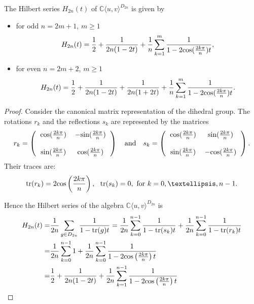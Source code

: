 \documentclass[10pt,a4paper]{amsart}
\newcommand{\CuvD}{{\mathbb C}\langle u,v\rangle^{D_{2n}}}
\begin{document}
\begin{theorem}
	The Hilbert series $H_{2n}(t)$ of $\mathbb{C}\langle u,v \rangle^{D_{2n}}$ is given by
	\begin{itemize}
		\item [(i)]for odd  $n=2m+1$, $m\geq1$
		\[
		H_{2n}(t)=\frac{1}{2}+\frac{1}{2n(1-2t)}+\frac{1}{n}\sum_{k=1}^{m}\frac{1}{1-2\text{\rm cos}(\frac{2k\pi}{n})t},
		\]
		
		\item [(ii)] for even $n=2m+2$, $m\geq1$
		\[
		H_{2n}(t)=\frac{1}{2}+\frac{1}{2n(1-2t)}+\frac{1}{2n(1+2t)}+\frac{1}{n}\sum_{k=1}^{m}\frac{1}{1-2\text{\rm cos}(\frac{2k\pi}{n})t}.
		\]
	\end{itemize}
\end{theorem}

\begin{proof}
	Consider the canonical matrix representation of the dihedral group. The rotations $r_k$ and the reflections $s_k$ are represented by the matrices
	\[
	r_k=\left(\begin{tabular}{  c  c  }
		$\text{\rm cos}(\frac{2k\pi}{n})$& $-\text{\rm sin}(\frac{2k\pi}{n})$ \\
		&\\
		$\text{\rm sin}(\frac{2k\pi}{n})$ &$\text{\rm cos}(\frac{2k\pi}{n})$\\
	\end{tabular}\right) \ \ \ \text{\rm and} \ \ \
	s_k=\left(\begin{tabular}{  c  c  }
		$\text{\rm cos}(\frac{2k\pi}{n})$& $\text{\rm sin}(\frac{2k\pi}{n})$ \\
		&\\
		$\text{\rm sin}(\frac{2k\pi}{n})$ & $-\text{\rm cos}(\frac{2k\pi}{n})$\\
	\end{tabular}\right).
	\]
Their traces are:
\[
\text{\rm tr}(r_k)=2\text{\rm cos}\left(\frac{2k\pi}{n}\right), \ \   \text{\rm tr}(s_k)=0, \text{ for } k=0,\ldots,n-1.
\]

Hence the Hilbert series of the algebra $\CuvD$ is
\begin{align}
H_{2n}(t)=&\frac{1}{2n}\sum_{g\in D_{2n}}\frac{1}{1-\text{\rm tr}(g)t}\nonumber
		=\frac{1}{2n}\sum_{k=0}^{n-1}\frac{1}{1-\text{\rm tr}(s_k)t}+\frac{1}{2n}\sum_{k=0}^{n-1}\frac{1}{1-\text{\rm tr}(r_k)t}\nonumber\\
		=&\frac{1}{2n}\sum_{k=0}^{n-1}{1}+\frac{1}{2n}\sum_{k=0}^{n-1}\frac{1}{1-2\text{\rm cos}\left(\frac{2k\pi}{n}\right)t}\nonumber\\
		=&\frac{1}{2}+\frac{1}{2n(1-2t)}+\frac{1}{2n}\sum_{k=1}^{n-1}\frac{1}{1-2\text{\rm cos}\left(\frac{2k\pi}{n}\right)t}\nonumber
	\end{align}
	

\end{proof}
\end{document}
